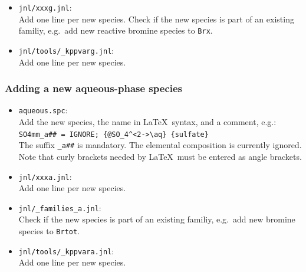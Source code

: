 \documentclass[twoside]{article}
\def\nosep{\setlength\parsep{0mm}\setlength\topsep{0mm}\setlength\itemsep{0mm}}
\begin{document}
\begin{itemize}\nosep
\item \verb|jnl/xxxg.jnl|:\\
  Add one line per new species. Check if the new species is part of an
  existing familiy, e.g.\ add new reactive bromine species to
  \verb|Brx|.
\end{itemize}

\begin{itemize}\nosep
\item \verb|jnl/tools/_kppvarg.jnl|:\\
  Add one line per new species.
\end{itemize}

\subsubsection{Adding a new aqueous-phase species}

\begin{itemize}\nosep
\item \verb|aqueous.spc|:\\
  Add the new species, the name in La\TeX\ syntax, and a comment,
  e.g.:\\
  \verb|SO4mm_a## = IGNORE; {@SO_4^<2->\aq} {sulfate}|\\
  The suffix \verb|_a##| is mandatory. The elemental composition is
  currently ignored. Note that curly brackets needed by La\TeX\ must be
  entered as angle brackets.
\end{itemize}

\begin{itemize}\nosep
\item \verb|jnl/xxxa.jnl|:\\
  Add one line per new species. 
\end{itemize}

\begin{itemize}\nosep
\item \verb|jnl/_families_a.jnl|:\\
  Check if the new species is part of an existing familiy, e.g.\ add new
  bromine species to \verb|Brtot|.
\end{itemize}

\begin{itemize}\nosep
\item \verb|jnl/tools/_kppvara.jnl|:\\
  Add one line per new species.
\end{itemize}
\end{document}
